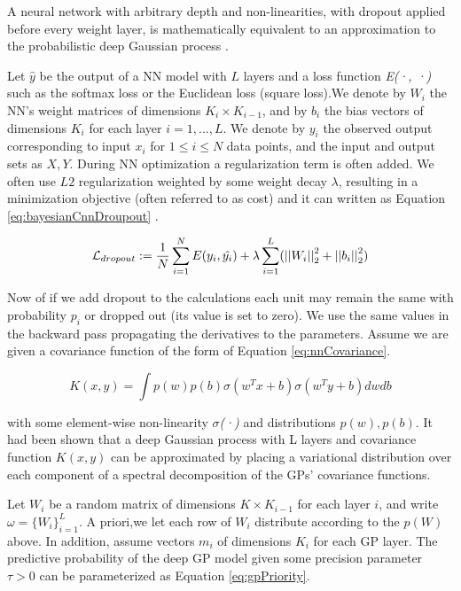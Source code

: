 \documentclass[a4paper,fleqn]{cas-dc}
\begin{document}
A neural network with arbitrary depth and non-linearities, with dropout applied before every weight layer, is mathematically equivalent to an approximation to the probabilistic deep Gaussian process \cite{Gal2016}.

Let $\hat{y}$ be the output of a NN model with $L$ layers and a loss function {\it E(·, ·)} such as the softmax loss or the Euclidean loss (square loss).We denote by $W_i$ the NN’s weight matrices of dimensions $K_i \times K_{i-1}$, and by $b_i$ the bias vectors of dimensions $K_i$ for each layer $i = 1, ..., L$. We denote by $y_i$ the observed output corresponding to input $x_i$ for $1 \leq i \leq N$ data points, and the input and output sets as $X, Y$. During NN optimization a regularization term is often added. We often use $L2$ regularization weighted by some weight decay $\lambda$, resulting in a minimization objective (often referred to as cost) and it can written as Equation  \eqref{eq:bayesianCnnDroupout} \cite{Gal2016}.

\begin{equation}
\mathcal{L}_{dropout} := 
    {1 \over N} \sum_{i=1}^{N} E(y_i , \hat{y_i}) + \\
    \lambda \sum_{i=1}^{L} ( \left|\left| W_i \right|\right|_2^2 + \left|\left| b_i \right|\right|_2^2 )
\label{eq:bayesianCnnDroupout} 
\end{equation}

Now of if we add dropout to the calculations each unit may remain the same with probability $p_i$ or dropped out (its value is set to zero). We use the same values in the backward pass propagating the derivatives to the parameters. Assume we are given a covariance function of the form of Equation \eqref{eq:nnCovariance}.

\begin{equation}
K(x, y) = \int p(w)p(b) \sigma (w^T x + b) \sigma (w^T y + b) dw db
\label{eq:nnCovariance}
\end{equation}

with some element-wise non-linearity {\it $\sigma$(·)} and distributions $p(w), p(b)$. It had been shown that a deep Gaussian process with L layers and covariance function $K(x,y)$ can be approximated by placing a variational distribution over each component of a spectral decomposition of the GPs’ covariance functions.

Let $W_i$ be a random matrix of dimensions $K \times K_{i-1}$ for each layer $i$, and write
$\omega = \{ W_i \}^L_{i=1}$. A priori,we let each row of $W_i$ distribute according to the $p(W)$ above. In addition, assume vectors $m_i$ of dimensions $K_i$ for each GP layer. The predictive probability of the deep GP model given some precision parameter $\tau > 0$ can be parameterized as Equation \eqref{eq:gpPriority}.
\end{document}
